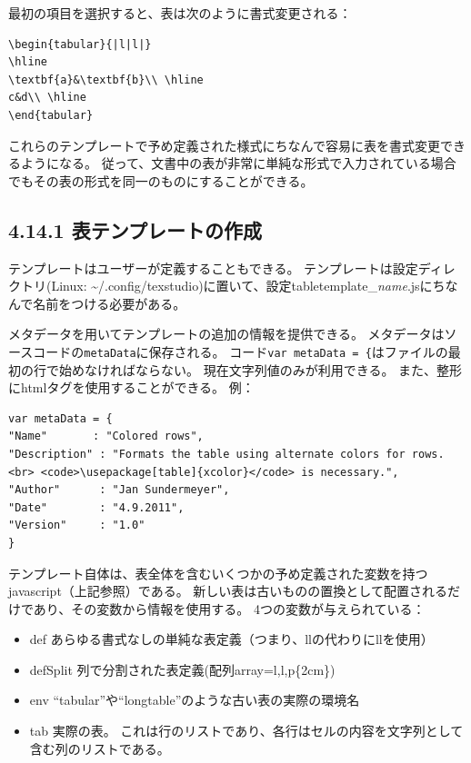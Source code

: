 \documentclass[]{book}
\begin{document}
最初の項目を選択すると、表は次のように書式変更される：

\begin{lstlisting}
\begin{tabular}{|l|l|}
\hline
\textbf{a}&\textbf{b}\\ \hline
c&d\\ \hline
\end{tabular}
\end{lstlisting}

これらのテンプレートで予め定義された様式にちなんで容易に表を書式変更できるようになる。
従って、文書中の表が非常に単純な形式で入力されている場合でもその表の形式を同一のものにすることができる。

\subsection{4.14.1 表テンプレートの作成}

テンプレートはユーザーが定義することもできる。
テンプレートは設定ディレクトリ(Linux:
\textasciitilde{}/.config/texstudio)に置いて、設定tabletemplate\_\emph{name}.jsにちなんで名前をつける必要がある。

メタデータを用いてテンプレートの追加の情報を提供できる。
メタデータはソースコードの\lstinline!metaData!に保存される。
コード\lstinline!var metaData = {!はファイルの最初の行で始めなければならない。
現在文字列値のみが利用できる。
また、整形にhtmlタグを使用することができる。 例：

\begin{lstlisting}
var metaData = {
"Name"       : "Colored rows",
"Description" : "Formats the table using alternate colors for rows. <br> <code>\usepackage[table]{xcolor}</code> is necessary.", 
"Author"      : "Jan Sundermeyer",
"Date"        : "4.9.2011",
"Version"     : "1.0"
}
\end{lstlisting}

テンプレート自体は、表全体を含むいくつかの予め定義された変数を持つjavascript（上記参照）である。
新しい表は古いものの置換として配置されるだけであり、その変数から情報を使用する。
4つの変数が与えられている：

\begin{itemize}
\item
  def
  あらゆる書式なしの単純な表定義（つまり、\textbar{}l\textbar{}l\textbar{}の代わりにllを使用）
\item
  defSplit 列で分割された表定義(配列array=l,l,p\{2cm\})
\item
  env ``tabular''や``longtable''のような古い表の実際の環境名
\item
  tab 実際の表。
  これは行のリストであり、各行はセルの内容を文字列として含む列のリストである。
\end{itemize}
\end{document}
